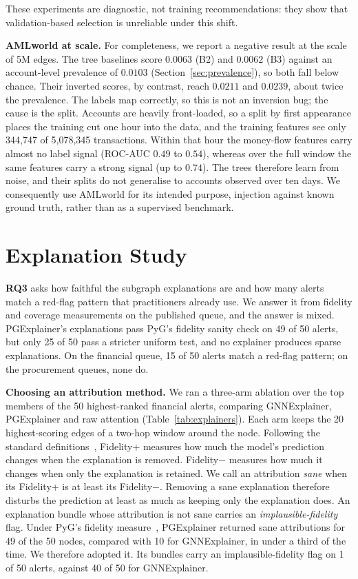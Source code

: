 \documentclass[conference]{IEEEtran}
\newcommand{\RQ}[1]{\textbf{RQ#1}}
\begin{document}
These experiments are diagnostic, not training recommendations: they show that
validation-based selection is unreliable under this shift.

\textbf{AMLworld at scale.} For completeness, we report a negative result at the
scale of 5M edges. The tree baselines score $0.0063$ (B2) and $0.0062$ (B3) against an
account-level prevalence of $0.0103$ (Section~\ref{sec:prevalence}), so both
fall below chance. Their inverted scores, by contrast, reach $0.0211$ and
$0.0239$, about twice the prevalence. The labels map
correctly, so this is not an inversion bug; the cause is the split. Accounts
are heavily front-loaded, so a split by first appearance places the training
cut one hour into the data, and the training features see only 344,747 of
5,078,345 transactions. Within that hour the money-flow features carry almost
no label signal (ROC-AUC $0.49$ to $0.54$), whereas over the full window the
same features carry a strong signal (up to $0.74$). The trees therefore learn
from noise, and their splits do not generalise to accounts observed over ten
days. We consequently use AMLworld for its intended purpose, injection against
known ground truth, rather than as a supervised benchmark.

\section{Explanation Study}
\label{sec:rq3}

\RQ{3} asks how faithful the subgraph explanations are and how many alerts
match a red-flag pattern that practitioners already use. We answer it from
fidelity and coverage measurements on the published queue, and the answer is
mixed. PGExplainer's explanations pass PyG's fidelity sanity check on 49 of 50
alerts, but only 25 of 50 pass a stricter uniform test, and no explainer
produces sparse explanations. On the financial queue, 15 of 50 alerts match a
red-flag pattern; on the procurement queues, none do.

\textbf{Choosing an attribution method.} We ran a three-arm ablation over the
top members of the 50 highest-ranked financial alerts, comparing GNNExplainer,
PGExplainer and raw attention (Table~\ref{tab:explainers}). Each arm keeps the 20 highest-scoring edges of a two-hop window around the node.
Following the standard definitions~\cite{yuan2023,agarwal2023}, Fidelity+
measures how much the model's prediction changes when the explanation is
removed. Fidelity$-$ measures how much it changes when only the explanation is
retained. We call an attribution \emph{sane} when its Fidelity+ is at least its
Fidelity$-$. Removing a sane explanation therefore disturbs the prediction at
least as much as keeping only the explanation does. An explanation bundle whose
attribution is not sane carries an \emph{implausible-fidelity} flag. Under
PyG's fidelity measure~\cite{fey2019}, PGExplainer returned sane attributions for 49
of the 50 nodes, compared with 10 for GNNExplainer, in under a third of the
time. We therefore adopted it. Its bundles carry an implausible-fidelity
flag on 1 of 50 alerts, against 40 of 50 for GNNExplainer.
\end{document}
